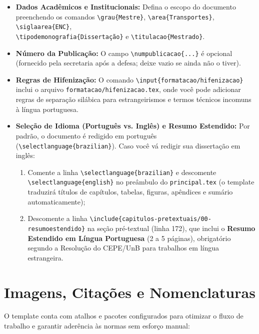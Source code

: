 \documentclass[12pt, a4paper]{article}
\begin{document}
\begin{itemize}
    \item \textbf{Dados Acadêmicos e Institucionais:} Defina o escopo do documento preenchendo os comandos \texttt{\textbackslash grau\{Mestre\}}, \texttt{\textbackslash area\{Transportes\}}, \texttt{\textbackslash siglaarea\{ENC\}}, \\ \texttt{\textbackslash tipodemonografia\{Dissertação\}} e \texttt{\textbackslash titulacao\{Mestrado\}}.
    \item \textbf{Número da Publicação:} O campo \texttt{\textbackslash numpublicacao\{...\}} é opcional (fornecido pela secretaria após a defesa; deixe vazio se ainda não o tiver).
    \item \textbf{Regras de Hifenização:} O comando \texttt{\textbackslash input\{formatacao/hifenizacao\}} inclui o arquivo \texttt{formatacao/hifenizacao.tex}, onde você pode adicionar regras de separação silábica para estrangeirismos e termos técnicos incomuns à língua portuguesa.
    \item \textbf{Seleção de Idioma (Português vs. Inglês) e Resumo Estendido:} Por padrão, o documento é redigido em português (\texttt{\textbackslash selectlanguage\{brazilian\}}). Caso você vá redigir sua dissertação em inglês:
    \begin{enumerate}
        \item Comente a linha \texttt{\textbackslash selectlanguage\{brazilian\}} e descomente \\ \texttt{\textbackslash selectlanguage\{english\}} no preâmbulo do \texttt{principal.tex} (o template traduzirá títulos de capítulos, tabelas, figuras, apêndices e sumário automaticamente);
        \item Descomente a linha \texttt{\textbackslash include\{capitulos-pretextuais/00-resumoestendido\}} na seção pré-textual (linha 172), que inclui o \textbf{Resumo Estendido em Língua Portuguesa} (2 a 5 páginas), obrigatório segundo a Resolução do CEPE/UnB para trabalhos em língua estrangeira.
    \end{enumerate}
\end{itemize}

\section{Imagens, Citações e Nomenclaturas}

O template conta com atalhos e pacotes configurados para otimizar o fluxo de trabalho e garantir aderência às normas sem esforço manual:
\end{document}
